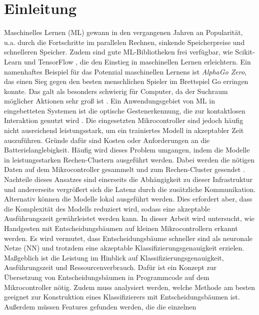 \chapter{Einleitung}
Maschinelles Lernen (ML) gewann in den vergangenen Jahren an Popularität, u.a. durch die Fortschritte im parallelen Rechnen,
sinkende Speicherpreise und schnelleren Speicher. Zudem sind gute ML-Bibliotheken frei verfügbar, wie Scikit-Learn \cite{scikit-learn} und TensorFlow \cite{abadi2016tensorflow}, die
den Einstieg in maschinellen Lernen erleichtern. Ein namenhaftes Beispiel für das Potenzial maschinellen Lernens ist \textit{AlphaGo Zero},
das einen Sieg gegen den besten menschlichen Spieler im Brettspiel Go erringen konnte. Das galt als besonders schwierig für Computer,
da der Suchraum möglicher Aktionen sehr groß ist \cite{silver2017mastering}.
\newline
\newline
Ein Anwendungsgebiet von ML in eingebetteten Systemen ist die optische Gestenerkennung, die zur kontaktlosen Interaktion genutzt wird \cite{pavlovic1997visual}.
Die eingesetzten Mikrocontroller sind jedoch häufig nicht ausreichend leistungsstark, um ein trainiertes Modell in akzeptabler Zeit auszuführen. Gründe dafür sind
Kosten oder Anforderungen an die Batterielanglebigkeit. Häufig wird dieses Problem umgangen, indem die Modelle in leistungsstarken Rechen-Clustern ausgeführt werden.
Dabei werden die nötigen Daten auf dem Mikrocontroller gesammelt und zum Rechen-Cluster gesendet \cite{venzkeArticle}. Nachteile dieses Ansatzes sind einerseits die Abhängigkeit zu dieser
Infrastruktur und andererseits vergrößert sich die Latenz durch die zusätzliche Kommunikation. Alternativ können die Modelle lokal ausgeführt werden. Dies erfordert aber, dass die
Komplexität des Modells reduziert wird, sodass eine akzeptable Ausführungszeit gewährleistet werden kann.
\newline
\newline
In dieser Arbeit wird untersucht, wie Handgesten mit Entscheidungsbäumen auf kleinen Mikrocontrollern erkannt werden. Es wird vermutet, dass Entscheidungsbäume schneller sind als neuronale Netze (NN) und
trotzdem eine akzeptable Klassifizierungsgenauigkeit erzielen. Maßgeblich ist die Leistung im Hinblick auf Klassifizierungsgenauigkeit, Ausführungszeit und Ressourcenverbrauch.
Dafür ist ein Konzept zur Übersetzung von Entscheidungsbäumen in Programmcode auf dem Mikrocontroller nötig.
Zudem muss analysiert werden, welche Methode am besten geeignet zur Konstruktion eines Klassifizierers mit Entscheidungsbäumen ist. Außerdem müssen Features gefunden werden, die die einzelnen
